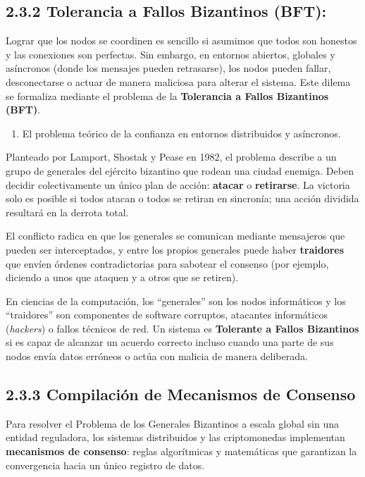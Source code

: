 \documentclass[12pt,a4paper]{article}
\begin{document}
\subsection*{2.3.2 Tolerancia a Fallos Bizantinos (BFT):}

Lograr que los nodos se coordinen es sencillo si asumimos que todos son honestos y las conexiones son perfectas. Sin embargo, en entornos abiertos, globales y asíncronos (donde los mensajes pueden retrasarse), los nodos pueden fallar, desconectarse o actuar de manera maliciosa para alterar el sistema. Este dilema se formaliza mediante el problema de la \textbf{Tolerancia a Fallos Bizantinos (BFT)}.

\begin{enumerate}[label=\alph*.]
    \item El problema teórico de la confianza en entornos distribuidos y asíncronos.
\end{enumerate}

Planteado por Lamport, Shostak y Pease en 1982, el problema describe a un grupo de generales del ejército bizantino que rodean una ciudad enemiga. Deben decidir colectivamente un único plan de acción: \textbf{atacar} o \textbf{retirarse}. La victoria solo es posible si todos atacan o todos se retiran en sincronía; una acción dividida resultará en la derrota total.

El conflicto radica en que los generales se comunican mediante mensajeros que pueden ser interceptados, y entre los propios generales puede haber \textbf{traidores} que envíen órdenes contradictorias para sabotear el consenso (por ejemplo, diciendo a unos que ataquen y a otros que se retiren).

En ciencias de la computación, los ``generales'' son los nodos informáticos y los ``traidores'' son componentes de software corruptos, atacantes informáticos (\textit{hackers}) o fallos técnicos de red. Un sistema es \textbf{Tolerante a Fallos Bizantinos} si es capaz de alcanzar un acuerdo correcto incluso cuando una parte de sus nodos envía datos erróneos o actúa con malicia de manera deliberada.

\subsection*{2.3.3 Compilación de Mecanismos de Consenso}

Para resolver el Problema de los Generales Bizantinos a escala global sin una entidad reguladora, los sistemas distribuidos y las criptomonedas implementan \textbf{mecanismos de consenso}: reglas algorítmicas y matemáticas que garantizan la convergencia hacia un único registro de datos.
\end{document}
